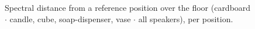 \begin{figure}[t]
\centering

\caption{Spectral distance from a reference position over the floor (cardboard $\cdot$ candle, cube, soap-dispenser, vase $\cdot$ all speakers), per position.}
\label{fig:spectral_distance_all_photo}
\end{figure}
